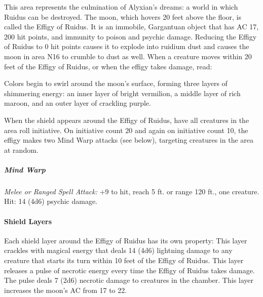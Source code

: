 \documentclass[10pt,a4,twoside,twocolumn,openany,nodeprecatedcode]{dndbook}
\begin{document}
This area represents the culmination of Alyxian's dreams: a world in which Ruidus can be destroyed. The moon, which hovers 20 feet above the floor, is called the Effigy of Ruidus. It is an immobile, Gargantuan object that has AC 17, 200 hit points, and immunity to poison and psychic damage. Reducing the Effigy of Ruidus to 0 hit points causes it to explode into ruidium dust and causes the moon in area N16 to crumble to dust as well.
When a creature moves within 20 feet of the Effigy of Ruidus, or when the effigy takes damage, read:
\begin{DndReadAloud}{}
Colors begin to swirl around the moon's surface, forming three layers of shimmering energy: an inner layer of bright vermilion, a middle layer of rich maroon, and an outer layer of crackling purple.
\end{DndReadAloud}

When the shield appears around the Effigy of Ruidus, have all creatures in the area roll initiative. On initiative count 20 and again on initiative count 10, the effigy makes two Mind Warp attacks (see below), targeting creatures in the area at random.
\begin{DndComment}{}
\subparagraph{Mind Warp}
\textsl{Melee or Ranged Spell Attack:} +9 to hit, reach 5 ft. or range 120 ft., one creature. Hit: 14 (4d6) psychic damage.
\end{DndComment}

\paragraph{Shield Layers}
Each shield layer around the Effigy of Ruidus has its own property:
{{This layer crackles with magical energy that deals 14 (4d6) lightning damage to any creature that starts its turn within 10 feet of the Effigy of Ruidus.}}
{{This layer releases a pulse of necrotic energy every time the Effigy of Ruidus takes damage. The pulse deals 7 (2d6) necrotic damage to creatures in the chamber.}}
{{This layer increases the moon's AC from 17 to 22.}}
\end{document}
